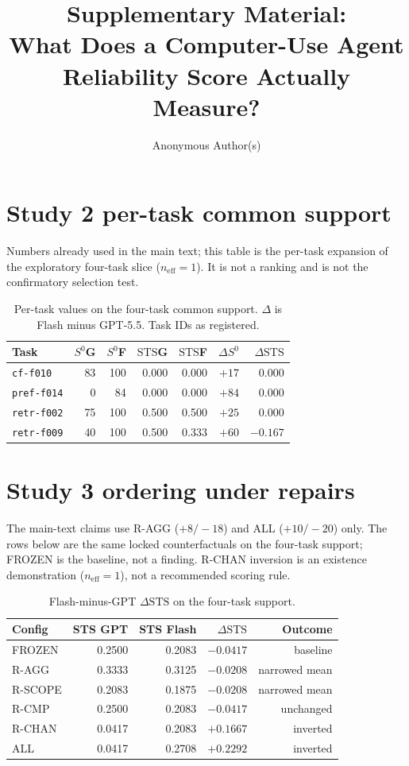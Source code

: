 \documentclass[sigconf,anonymous]{aamas}
\title{Supplementary Material:\\What Does a Computer-Use Agent Reliability Score Actually Measure?}
\author{Anonymous Author(s)}
\affiliation{%
  \institution{Institution withheld for review}
  \country{}}
\newcommand{\task}[1]{\texttt{#1}}
\newcommand{\STS}{\mathrm{STS}}
\begin{document}
\maketitle

\section{Study 2 per-task common support}

Numbers already used in the main text; this table is the per-task expansion of the exploratory four-task slice ($n_{\mathrm{eff}}{=}1$).
It is not a ranking and is not the confirmatory selection test.

\begin{table}[t]
\centering
\caption{Per-task values on the four-task common support. $\Delta$ is Flash minus GPT-5.5. Task IDs as registered.}
\label{tab:pertask}
\scriptsize
\setlength{\tabcolsep}{3pt}
\begin{tabular}{lrrrrrr}
\toprule
Task & $S^{0}$G & $S^{0}$F & $\STS$G & $\STS$F & $\Delta S^{0}$ & $\Delta\STS$ \\
\midrule
\task{cf-f010}   & 83 & 100 & 0.000 & 0.000 & $+17$ & $0.000$ \\
\task{pref-f014} &  0 &  84 & 0.000 & 0.000 & $+84$ & $0.000$ \\
\task{retr-f002} & 75 & 100 & 0.500 & 0.500 & $+25$ & $0.000$ \\
\task{retr-f009} & 40 & 100 & 0.500 & 0.333 & $+60$ & $-0.167$ \\
\bottomrule
\end{tabular}
\end{table}

\section{Study 3 ordering under repairs}

The main-text claims use R-AGG ($+8/-18$) and ALL ($+10/-20$) only.
The rows below are the same locked counterfactuals on the four-task support; FROZEN is the baseline, not a finding.
R-CHAN inversion is an existence demonstration ($n_{\mathrm{eff}}{=}1$), not a recommended scoring rule.

\begin{table}[h]
\centering
\caption{Flash-minus-GPT $\Delta\STS$ on the four-task support.}
\label{tab:repairs}
\small
\begin{tabular}{lrrrr}
\toprule
Config & STS GPT & STS Flash & $\Delta\STS$ & Outcome \\
\midrule
FROZEN  & 0.2500 & 0.2083 & $-0.0417$ & baseline \\
R-AGG   & 0.3333 & 0.3125 & $-0.0208$ & narrowed mean \\
R-SCOPE & 0.2083 & 0.1875 & $-0.0208$ & narrowed mean \\
R-CMP   & 0.2500 & 0.2083 & $-0.0417$ & unchanged \\
R-CHAN  & 0.0417 & 0.2083 & $+0.1667$ & inverted \\
ALL     & 0.0417 & 0.2708 & $+0.2292$ & inverted \\
\bottomrule
\end{tabular}
\end{table}
\end{document}
